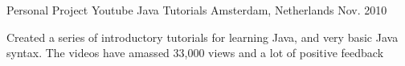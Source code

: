\begin{cventries}

\cventry
{Personal Project} %
{Youtube Java Tutorials} %
{Amsterdam, Netherlands} %
{Nov. 2010} %
{ %
\begin{cvitems}
\item {Created a series of introductory tutorials for learning Java, and very basic Java syntax. The videos have amassed 33,000 views and a lot of positive feedback}
\end{cvitems}
}


\end{cventries}